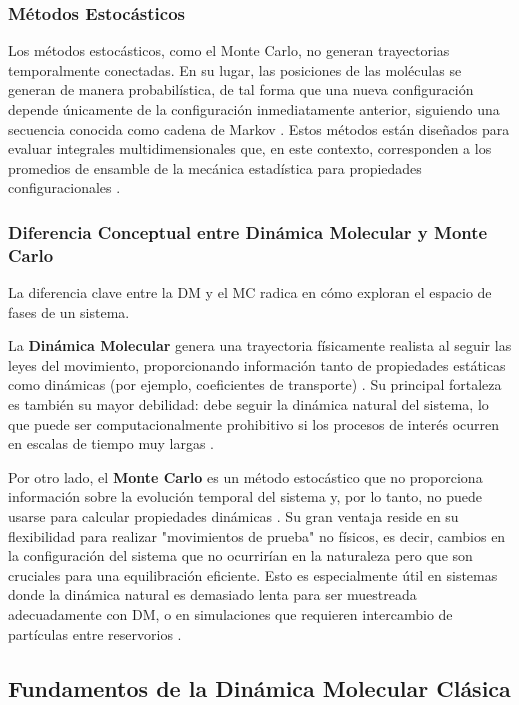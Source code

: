 \subsubsection{Métodos Estocásticos}
Los métodos estocásticos, como el Monte Carlo, no generan trayectorias temporalmente conectadas. En su lugar, las posiciones de las moléculas se generan de manera probabilística, de tal forma que una nueva configuración depende únicamente de la configuración inmediatamente anterior, siguiendo una secuencia conocida como cadena de Markov \cite[28]{haile1992molecular}. Estos métodos están diseñados para evaluar integrales multidimensionales que, en este contexto, corresponden a los promedios de ensamble de la mecánica estadística para propiedades configuracionales \cite[29]{haile1992molecular}.

\subsubsection{Diferencia Conceptual entre Dinámica Molecular y Monte Carlo}
La diferencia clave entre la DM y el MC radica en cómo exploran el espacio de fases de un sistema.

La \textbf{Dinámica Molecular} genera una trayectoria físicamente realista al seguir las leyes del movimiento, proporcionando información tanto de propiedades estáticas como dinámicas (por ejemplo, coeficientes de transporte) \cite[97, 54]{frenkel2002understanding}. Su principal fortaleza es también su mayor debilidad: debe seguir la dinámica natural del sistema, lo que puede ser computacionalmente prohibitivo si los procesos de interés ocurren en escalas de tiempo muy largas \cite[54]{frenkel2002understanding}.

Por otro lado, el \textbf{Monte Carlo} es un método estocástico que no proporciona información sobre la evolución temporal del sistema y, por lo tanto, no puede usarse para calcular propiedades dinámicas \cite[54]{frenkel2002understanding}. Su gran ventaja reside en su flexibilidad para realizar "movimientos de prueba" no físicos, es decir, cambios en la configuración del sistema que no ocurrirían en la naturaleza pero que son cruciales para una equilibración eficiente. Esto es especialmente útil en sistemas donde la dinámica natural es demasiado lenta para ser muestreada adecuadamente con DM, o en simulaciones que requieren intercambio de partículas entre reservorios \cite[405]{frenkel2002understanding}.

\subsection{Fundamentos de la Dinámica Molecular Clásica}

